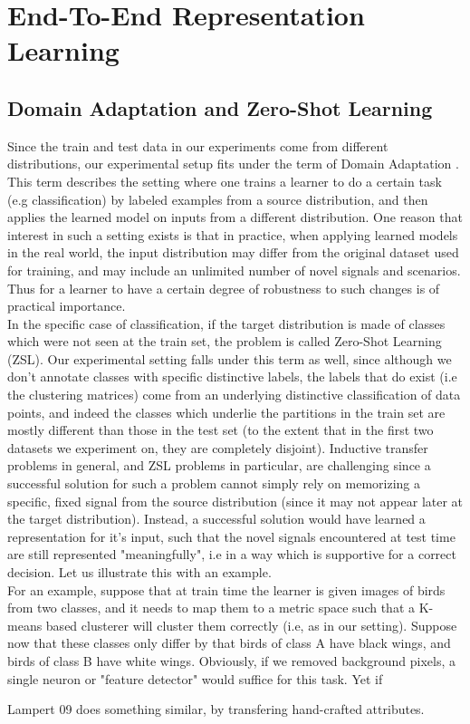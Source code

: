 \chapter{End-To-End Representation Learning}
\label{e2e_rep_learn}

\section{Domain Adaptation and Zero-Shot Learning} 
Since the train and test data in our experiments come from different distributions, our experimental setup fits under the term of Domain Adaptation \cite{greenwade93}. This term describes the setting where one trains a learner to do a certain task (e.g classification) by labeled examples from a source distribution, and then applies the learned model on inputs from a different distribution.
One reason that interest in such a setting exists is that in practice, when applying learned models in the real world, the input distribution may differ from the original dataset used for training, and may include an unlimited number of novel signals and scenarios. Thus for a learner to have a certain degree of robustness to such changes is of practical importance.\\
In the specific case of classification, if the target distribution is made of classes which were not seen at the train set, the problem is called Zero-Shot Learning (ZSL). Our experimental setting falls under this term as well, since although we don't annotate classes with specific distinctive labels, the labels that do exist (i.e the clustering matrices) come from an underlying distinctive classification of data points, and indeed the classes which underlie the partitions in the train set are mostly different than those in the test set (to the extent that in the first two datasets we experiment on, they are completely disjoint).
Inductive transfer problems in general, and ZSL problems in particular, are challenging since a successful solution for such a problem cannot simply rely on memorizing a specific, fixed signal from the source distribution (since it may not appear later at the target distribution). Instead, a successful solution would have learned a representation for it's input, such that the novel signals encountered at test time are still represented "meaningfully", i.e in a way which is supportive for a correct decision. Let us illustrate this with an example.\\
For an example, suppose that at train time the learner is given images of birds from two classes, and it needs to map them to a metric space such that a K-means based clusterer will cluster them correctly (i.e, as in our setting). Suppose now that these classes only differ by that birds of class A have black wings, and birds of class B have white wings. Obviously, if we removed background pixels, a single neuron or "feature detector" would suffice for this task. Yet if   


Lampert 09 does something similar, by transfering hand-crafted attributes.